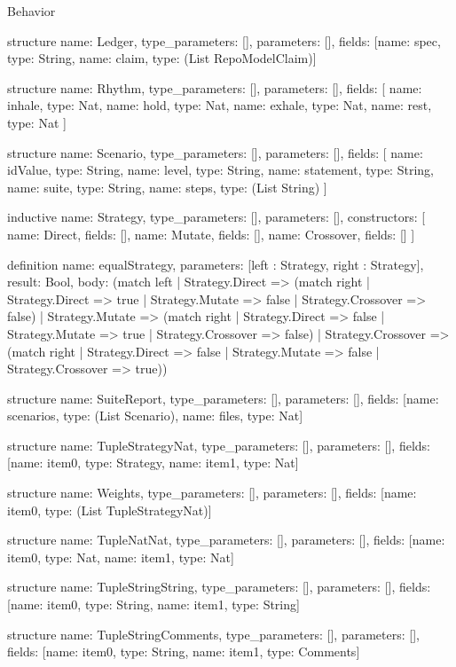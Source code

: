 \begin{lexlean}{Behavior}
\begin{semanticmodule}
structure{
  name: Ledger,
  type_parameters: [],
  parameters: [],
  fields: [{name: spec, type: String}, {name: claim, type: (List RepoModelClaim)}]
}

structure{
  name: Rhythm,
  type_parameters: [],
  parameters: [],
  fields: [
    {name: inhale, type: Nat},
    {name: hold, type: Nat},
    {name: exhale, type: Nat},
    {name: rest, type: Nat}
  ]
}

structure{
  name: Scenario,
  type_parameters: [],
  parameters: [],
  fields: [
    {name: idValue, type: String},
    {name: level, type: String},
    {name: statement, type: String},
    {name: suite, type: String},
    {name: steps, type: (List String)}
  ]
}

inductive{
  name: Strategy,
  type_parameters: [],
  parameters: [],
  constructors: [
    {name: Direct, fields: []},
    {name: Mutate, fields: []},
    {name: Crossover, fields: []}
  ]
}

definition{
  name: equalStrategy,
  parameters: [left : Strategy, right : Strategy],
  result: Bool,
  body: (match left
    | Strategy.Direct => (match right
      | Strategy.Direct => true
      | Strategy.Mutate => false
      | Strategy.Crossover => false)
    | Strategy.Mutate => (match right
      | Strategy.Direct => false
      | Strategy.Mutate => true
      | Strategy.Crossover => false)
    | Strategy.Crossover => (match right
      | Strategy.Direct => false
      | Strategy.Mutate => false
      | Strategy.Crossover => true))
}

structure{
  name: SuiteReport,
  type_parameters: [],
  parameters: [],
  fields: [{name: scenarios, type: (List Scenario)}, {name: files, type: Nat}]
}

structure{
  name: TupleStrategyNat,
  type_parameters: [],
  parameters: [],
  fields: [{name: item0, type: Strategy}, {name: item1, type: Nat}]
}

structure{
  name: Weights,
  type_parameters: [],
  parameters: [],
  fields: [{name: item0, type: (List TupleStrategyNat)}]
}

structure{
  name: TupleNatNat,
  type_parameters: [],
  parameters: [],
  fields: [{name: item0, type: Nat}, {name: item1, type: Nat}]
}

structure{
  name: TupleStringString,
  type_parameters: [],
  parameters: [],
  fields: [{name: item0, type: String}, {name: item1, type: String}]
}

structure{
  name: TupleStringComments,
  type_parameters: [],
  parameters: [],
  fields: [{name: item0, type: String}, {name: item1, type: Comments}]
}


\end{semanticmodule}
\end{lexlean}
